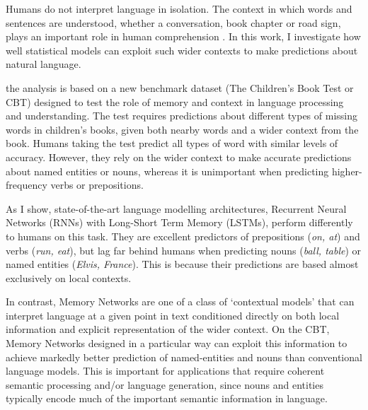 Humans do not interpret language in isolation. The context in which words and sentences are understood, whether a conversation, book chapter or road sign, plays an important role in human comprehension \citep{altmann1988interaction,binder2011neurobiology}. In this work, I investigate how well statistical models can exploit such wider contexts to make predictions about natural language.

the analysis is based on a new benchmark dataset (The Children's Book Test or CBT) designed to test the role of memory and context in language processing and understanding. The test requires predictions about different types of missing words in children's books, given both nearby words and a wider context from the book. Humans taking the test predict all types of word with similar levels of accuracy. However, they rely on the wider context to make accurate predictions about named entities or nouns, whereas it is unimportant when predicting higher-frequency verbs or prepositions. 

As I show, state-of-the-art language modelling architectures, Recurrent Neural Networks (RNNs) with Long-Short Term Memory  (LSTMs), perform differently to humans on this task. They are excellent predictors of prepositions (\emph{on, at}) and verbs (\emph{run, eat}), but lag far behind humans when predicting nouns (\emph{ball, table}) or named entities (\emph{Elvis, France}). This is because their predictions are based almost exclusively on local contexts.  

In contrast, Memory Networks \citep{weston2014memory} are one of a class of `contextual models' that can interpret language at a given point in text conditioned directly on both local information and explicit representation of the wider context. On the CBT, Memory Networks designed in a particular way can exploit this information to achieve markedly better prediction of named-entities and nouns than conventional language models. This is important for applications that require coherent semantic processing and/or language generation, since nouns and entities typically encode much of the important semantic information in language. 


